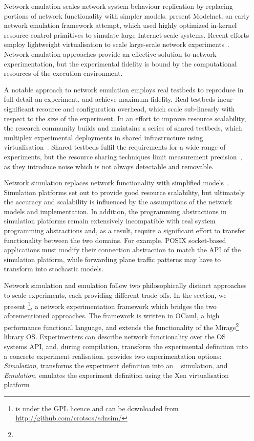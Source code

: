 Network emulation scales network system behaviour replication by replacing
portions of network functionality with simpler models.  
present Modelnet, an early network emulation framework attempt, which used
highly optimized in-kernel resource control primitives to simulate large
Internet-scale systems. Recent efforts employ lightweight virtualisation to
scale large-scale network experiments~.
Network emulation approaches provide an effective solution to network
experimentation, but the experimental fidelity is bound by the computational
resources of the execution environment.

A notable approach to network emulation employs real testbeds to reproduce in
full detail an experiment, and achieve maximum fidelity. Real testbeds incur
significant resource and configuration overhead, which scale sub-linearly with
respect to the size of the experiment. In an effort to improve resource
scalability, the research community builds and maintains a series of shared
testbeds, which multiplex experimental deployments in shared infrastructure
using virtualisation~.  Shared testbeds fulfil the
requirements for a wide range of experiments, but the resource sharing
techniques limit measurement precision~, as they introduce noise which is not
always detectable and removable.

Network simulation replaces network functionality with simplified
models~.  Simulation platforms set out to
provide good resource scalability, but ultimately the accuracy and scalability
is influenced by the assumptions of the network models and implementation.  In
addition, the programming abstractions in simulation platforms remain
extensively incompatible with real system programming abstractions and, as a
result, require a significant effort to transfer functionality between the two
domains.  For example, POSIX socket-based applications must modify their
connection abstraction to match the API of the simulation platform, while
forwarding plane traffic patterns may have to transform into stochastic models. 

Network simulation and emulation follow two philosophically distinct approaches
to scale experiments, each providing different trade-offs.   In the section, we
present \sdnsim\footnote{\sdnsim is under the GPL licence and can be downloaded
  from \url{http://github.com/crotsos/sdnsim/}}, a network experimentation
framework which bridges the two aforementioned approaches. The framework is
written in OCaml, a high performance functional language, and extends the
functionality of the Mirage\footnote{\mirageurl} library OS\@.  Experimenters can
describe network functionality over the \mirage OS systems API, and, during
compilation, transform the experimental definition into a concrete experiment
realisation. \sdnsim provides two experimentation options: \emph{Simulation},
transforms the experiment definition into an ~
simulation, and \emph{Emulation}, emulates the experiment definition using 
the Xen virtualisation platform~.

